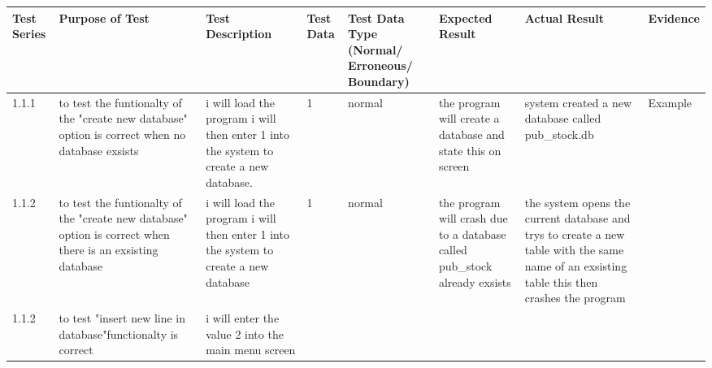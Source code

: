 \begin{landscape}
\begin{center}
    \begin{longtable}{|p{1.5cm}|p{2.5cm}|p{2.5cm}|p{2cm}|p{2cm}|p{2cm}|p{2cm}|p{2cm}|}
        \hline
        \textbf{Test Series} & \textbf{Purpose of Test} & \textbf{Test Description} & \textbf{Test Data} & \textbf{Test Data Type (Normal/ Erroneous/ Boundary)} & \textbf{Expected Result} & \textbf{Actual Result} & \textbf{Evidence}\\ \hline
       1.1.1 & to test the funtionalty of the "create new database" option is correct when no database exsists & i will load the program i will then enter 1 into the system to create a new database. & 1 & normal & the program will create a database and state this on screen &system created a new database called pub_stock.db & Example \\ \hline
1.1.2 & to test the funtionalty of the "create new database" option is correct when there is an exsisting database  &  i will load the program i will then enter 1 into the system to create a new database & 1 & normal &the program will crash due to a database called pub_stock already exsists & the system opens the current database and trys to create a new table with the same name of an exsisting table this then crashes the program & \\ \hline
1.1.2 & to test "insert new line in database"functionalty is correct & i will enter the value 2 into the main menu screen



\end{longtable}
\end{center}
\end{landscape}
